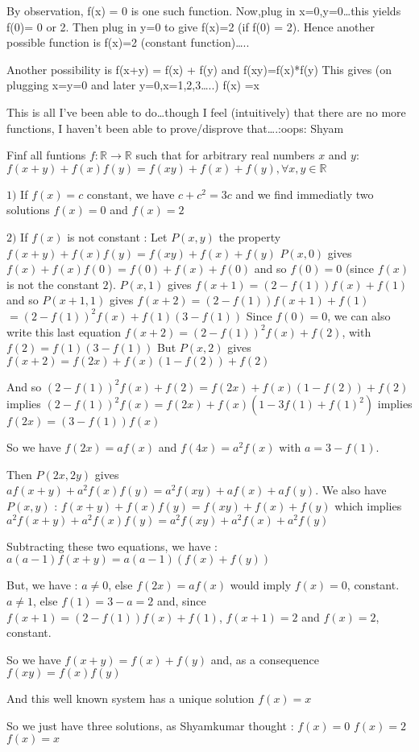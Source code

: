 \begin{mysolution}
	By observation, f(x) = 0 is one such function.
Now,plug in x=0,y=0…this yields f(0)= 0 or 2.
Then plug in y=0 to give f(x)=2 (if f(0) = 2).
Hence another possible function is f(x)=2 (constant function)…..

Another possibility is f(x+y) = f(x) + f(y) and f(xy)=f(x)*f(y)
This gives (on plugging x=y=0 and later y=0,x=1,2,3…..) f(x) =x

This is all I’ve been able to do…though I feel (intuitively) that there are no more functions, I haven’t been able to prove/disprove that….:oops: 
Shyam
\end{mysolution}



\begin{mysolution}
	\begin{tcolorbox}Finf all funtions $ f: \mathbb{R}\to\mathbb{R}$ such that for arbitrary real numbers $ x$ and $ y$: $ f(x + y) + f(x)f(y) = f(xy) + f(x) + f(y),\forall x,y\in\mathbb{R}$\end{tcolorbox}

$ 1)$ If $ f(x)=c$ constant, we have $ c+c^2=3c$ and we find immediatly two solutions $ f(x)=0$ and $ f(x)=2$

$ 2)$ If $ f(x)$ is not constant :
Let $ P(x,y)$ the property $ f(x + y) + f(x)f(y) = f(xy) + f(x) + f(y)$
$ P(x,0)$ gives $ f(x) + f(x)f(0) = f(0) + f(x) + f(0)$ and so $ f(0)=0$ (since $ f(x)$ is not the constant $ 2$).
$ P(x,1)$ gives $ f(x+1)=(2-f(1))f(x)+f(1)$ and so 
$ P(x+1,1)$ gives $ f(x+2)=(2-f(1))f(x+1)+f(1)$ $ =(2-f(1))^2f(x)+f(1)(3-f(1))$
Since $ f(0)=0$, we can also write this last equation $ f(x+2)=(2-f(1))^2f(x)+f(2)$, with $ f(2)=f(1)(3-f(1))$
But $ P(x,2)$ gives $ f(x+2)=f(2x)+f(x)(1-f(2))+f(2)$

And so $ (2-f(1))^2f(x)+f(2)=f(2x)+f(x)(1-f(2))+f(2)$
implies $ (2-f(1))^2f(x)=f(2x)+f(x)(1-3f(1)+f(1)^2)$
implies $ f(2x)=(3-f(1))f(x)$

So we have $ f(2x)=af(x)$ and $ f(4x)=a^2f(x)$ with $ a=3-f(1)$.

Then $ P(2x,2y)$ gives $ af(x + y) + a^2f(x)f(y) = a^2f(xy) + af(x) + af(y)$.
We also have $ P(x,y)$ : $ f(x + y) + f(x)f(y) = f(xy) + f(x) + f(y)$ which implies $ a^2f(x + y) + a^2f(x)f(y) = a^2f(xy) + a^2f(x) + a^2f(y)$

Subtracting these two equations, we have :
$ a(a-1)f(x+y)=a(a-1)(f(x)+f(y))$

But, we have :
$ a\neq 0$, else $ f(2x)=af(x)$ would imply $ f(x)=0$, constant.
$ a\neq 1$, else $ f(1)=3-a=2$ and, since $ f(x+1)=(2-f(1))f(x)+f(1)$, $ f(x+1)=2$ and $ f(x)=2$, constant.

So we have $ f(x+y)=f(x)+f(y)$ and, as a consequence $ f(xy)=f(x)f(y)$

And this well known system has a unique solution $ f(x)=x$

So we just have three solutions, as Shyamkumar thought :
$ f(x)=0$
$ f(x)=2$
$ f(x)=x$
\end{mysolution}



